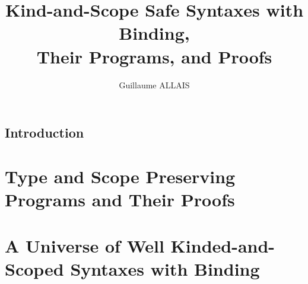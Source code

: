 \documentclass{memoir}
\title{Kind-and-Scope Safe Syntaxes with Binding, \\ Their Programs, and Proofs}
\author{Guillaume ALLAIS}
\begin{document}
\maketitle{}

\chapter{Introduction}

\label{introduction-agda}


\part{Type and Scope Preserving Programs and Their Proofs}
\label{type-scope-semantics}



\part{A Universe of Well Kinded-and-Scoped Syntaxes with Binding}
\label{a-universe}



\end{document}
